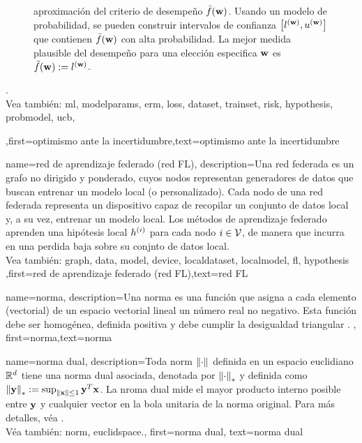 {{\begin{figure}[H]
\begin{center}
{	aproximación del criterio de desempeño $\bar{f}({\bf w})$. Usando un modelo de probabilidad, se pueden construir intervalos de confianza $\big[ l^{({\bf w})},  u^{({\bf w})} \big]$ 
	que contienen $\bar{f}({\bf w})$ con alta probabilidad. La mejor medida plausible del desempeño para una elección especifica ${\bf w}$ es $\tilde{f}({\bf w}) := l^{({\bf w})}$.} 
	\end{center}
		\end{figure}.
		\\
	 Vea también: \gls{ml}, \gls{modelparams}, \gls{erm}, \gls{loss}, \gls{dataset}, \gls{trainset}, \gls{risk}, \gls{hypothesis}, \gls{probmodel}, \gls{ucb},  },first={optimismo ante la incertidumbre},text={optimismo ante la incertidumbre} 
}

{name={red de aprendizaje federado (red FL)},
	description={Una red federada es un grafo no dirigido y ponderado, 
	cuyos nodos representan generadores de datos que buscan entrenar un modelo local (o personalizado). 
	Cada nodo de una red federada representa un dispositivo capaz de recopilar un conjunto de datos local
	y, a su vez, entrenar un modelo local. 
	Los métodos de aprendizaje federado aprenden una hipótesis local $h^{(i)}$ para
	cada nodo $i \in \mathcal{V}$, de manera que incurra en una perdida baja sobre su conjnto de datos local.
	\\
	 Vea también: \gls{graph},  \gls{data}, \gls{model}, \gls{device}, \gls{localdataset}, \gls{localmodel}, \gls{fl}, \gls{hypothesis}  },first={red de aprendizaje federado (red FL)},text={red FL} 
 }

{name={norma},
	description={Una norma es una función que asigna a cada elemento (vectorial) de un espacio 
		vectorial lineal un número real no negativo. Esta función debe ser homogénea, definida positiva y debe 
		cumplir la desigualdad triangular \cite{HornMatAnalysis}. },
	first={norma},text={norma} 
}

{name={norma dual},
description={Toda \gls{norm} $\left\Vert {\cdot} \right\Vert_{}$ definida en un espacio euclidiano $\mathbb{R}^{d}$ 
		tiene una norma dual asociada, denotada por $\left\Vert {\cdot} \right\Vert_{*}$ y definida como 
		$\left\Vert {{\bf y}} \right\Vert_{*} := \sup_{\Vert {{\bf x}} \Vert{} \le 1} {\bf y}^{T} {\bf x}$. 
		La nroma dual mide el mayor producto interno posible entre ${\bf y}$ y cualquier vector 
		en la bola unitaria de la norma original. Para más detalles, véa 
		\cite[Sec.~A.1.6]{BoydConvexBook}.\\ 
		Véa también: \gls{norm}, \gls{euclidspace}.},
	first={norma dual},
	text={norma dual}
}

